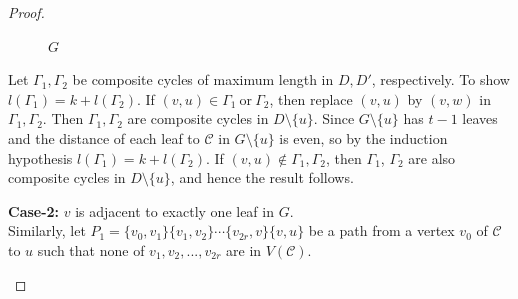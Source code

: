 \documentclass[a4paper, 10pt]{article}
\numberwithin{equation}{section}
\begin{document}
\begin{proof}
\begin{figure}[H]
\begin{tikzpicture}
		\end{tikzpicture}
		\caption{$G$}	
	\end{figure}
	
	Let $\Gamma_1, \Gamma_2$ be composite cycles of maximum length in $D, D'$, respectively. To show $l(\Gamma_1)=k+l(\Gamma_2)$. If $(v,u)\in \Gamma_1~\text{or}~\Gamma_2$, then replace $(v,u)$ by $(v,w)$ in $\Gamma_1,\Gamma_2$. Then $\Gamma_1,\Gamma_2$ are composite cycles in $D\setminus\{u\}$. Since $G\setminus\{u\}$ has $t-1$ leaves and the distance of each leaf to $\mathcal{C}$ in $G\setminus\{u\}$ is even, so by the induction hypothesis $l(\Gamma_1)=k+l(\Gamma_2)$.  If $(v,u)\notin \Gamma_1,\Gamma_2$, then $\Gamma_1$, $\Gamma_2$ are also composite cycles in $D \setminus \{u\}$, and hence the result follows.
	
	
	
	
	
	\textbf{Case-2:} $v$ is adjacent to exactly one leaf in $G$.\\
	Similarly, let $P_1=\{v_0,v_1\}\{v_1,v_2\}\cdots \{v_{2r},v\}\{v,u\}$ be a path from a vertex $v_0$ of $\mathcal{C}$ to $u$ such that none of $v_1,v_2,...,v_{2r}$ are in $V(\mathcal{C})$. 
	\begin{figure}[H]
		\tikzset{node distance=1cm}
		\centering
\end{figure}
\end{proof}
\end{document}
